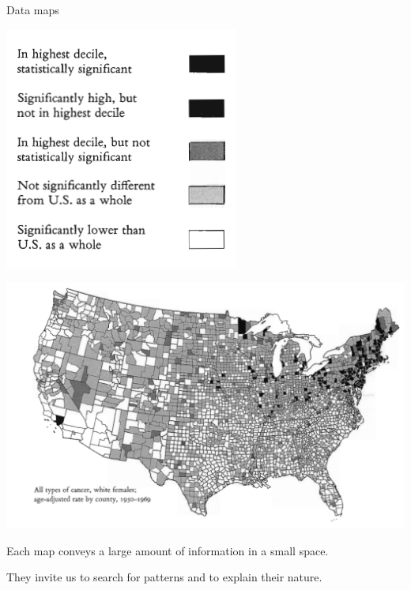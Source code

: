 \documentclass[
  ignorenonframetext,
]{beamer}
\begin{document}
\begin{frame}{Data maps}
\label{data-maps}
\begin{minipage}{0.3\textwidth}
\centering
\includegraphics[width=\textwidth]{excellence_figs/fig_5.png}
\end{minipage}
\hfill
\begin{minipage}{0.6\textwidth}
\centering
\includegraphics[width=\textwidth]{excellence_figs/fig_4.png}
\end{minipage}

Each map conveys a large amount of information in a small space.

They invite us to search for patterns and to explain their nature.
\end{frame}
\end{document}
